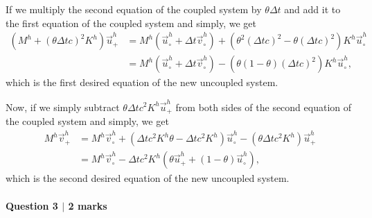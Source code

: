 \vspace{0.5cm}
\begin{solution}
If we multiply the second equation of the coupled system by $\theta \Delta t$ and add it to the first equation of the coupled system and simply, we get
\begin{align}\label{eqn:uncoupled1}
\left(M^h + \left(\theta \Delta t c\right)^2 K^h\right) \vec{u}^h_+
&= M^h \left( \vec{u}^h_\circ + \Delta t \vec{v}^h_\circ\right) +
\left( \theta^2 \left(\Delta t c\right)^2  - \theta \left(\Delta t c\right)^2 \right)K^h \vec{u}^h_\circ\nonumber\\
&= M^h \left( \vec{u}^h_\circ + \Delta t \vec{v}^h_\circ\right) - \left( \theta\left(1-\theta\right) \left(\Delta t c\right)^2 \right)K^h \vec{u}^h_\circ,
\end{align}
which is the first desired equation of the new uncoupled system.

Now, if we simply subtract $\theta \Delta t c^2 K^h \vec{u}^h_+$ from both sides of the second equation of the coupled system and simply, we get 
\begin{align}\label{eqn:uncoupled2}
M^h \vec{v}^h_+
&= M^h \vec{v}^h_\circ + \left( \Delta t c^2 K^h \theta - \Delta t c^2 K^h \right) \vec{u}^h_\circ -
\left( \theta \Delta t c^2 K^h \right) \vec{u}^h_+ \nonumber \\
&= M^h \vec{v}^h_\circ - 
\Delta t c^2 K^h \left( \theta \vec{u}^h_+ + (1-\theta) \vec{u}^h_\circ \right),
\end{align}
which is the second desired equation of the new uncoupled system.

\end{solution}


\newpage

\paragraph*{Question 3 $\vert$ 2 marks}

